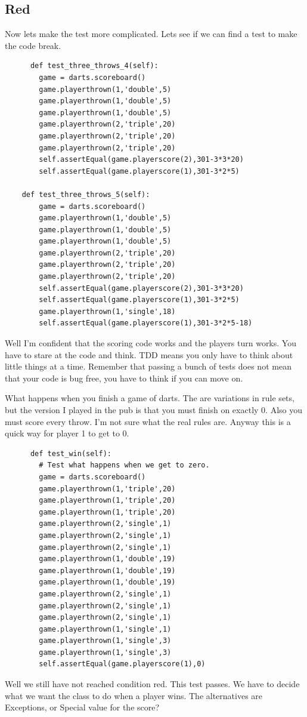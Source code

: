 \documentclass{paper}
\begin{document}
\subsection{Red}
Now lets make the test more complicated. Lets see if we can find a
test to make the code break.
\begin{lstlisting}
      def test_three_throws_4(self):
        game = darts.scoreboard()
        game.playerthrown(1,'double',5)
        game.playerthrown(1,'double',5)
        game.playerthrown(1,'double',5)
        game.playerthrown(2,'triple',20)
        game.playerthrown(2,'triple',20)
        game.playerthrown(2,'triple',20)
        self.assertEqual(game.playerscore(2),301-3*3*20)
        self.assertEqual(game.playerscore(1),301-3*2*5)
        
    def test_three_throws_5(self):
        game = darts.scoreboard()
        game.playerthrown(1,'double',5)
        game.playerthrown(1,'double',5)
        game.playerthrown(1,'double',5)
        game.playerthrown(2,'triple',20)
        game.playerthrown(2,'triple',20)
        game.playerthrown(2,'triple',20)
        self.assertEqual(game.playerscore(2),301-3*3*20)
        self.assertEqual(game.playerscore(1),301-3*2*5)        
        game.playerthrown(1,'single',18)
        self.assertEqual(game.playerscore(1),301-3*2*5-18)
\end{lstlisting}
Well I'm confident that the scoring code works and the players turn
works. You have to stare at the code and think. TDD means you only
have to think about little things at a time. Remember that passing a
bunch of tests does not mean that your code is bug free, you have to
think if you can move on.

What happens when you finish a game of darts. The are variations in
rule sets, but the version I played in the pub is that you must finish
on exactly 0.  Also you must score every throw. I'm not sure what the
real rules are. Anyway this is a quick way for player 1 to get to 0.

\begin{lstlisting}
      def test_win(self):
        # Test what happens when we get to zero.
        game = darts.scoreboard()
        game.playerthrown(1,'triple',20)
        game.playerthrown(1,'triple',20)
        game.playerthrown(1,'triple',20)
        game.playerthrown(2,'single',1)
        game.playerthrown(2,'single',1)
        game.playerthrown(2,'single',1)
        game.playerthrown(1,'double',19)
        game.playerthrown(1,'double',19)
        game.playerthrown(1,'double',19)
        game.playerthrown(2,'single',1)
        game.playerthrown(2,'single',1)
        game.playerthrown(2,'single',1)
        game.playerthrown(1,'single',1)
        game.playerthrown(1,'single',3)
        game.playerthrown(1,'single',3)
        self.assertEqual(game.playerscore(1),0)
\end{lstlisting}
Well we still have not reached condition red. This test passes. We
have to decide what we want the class to do when a player wins. 
The alternatives are  Exceptions, or  Special value for the score?
\end{document}
